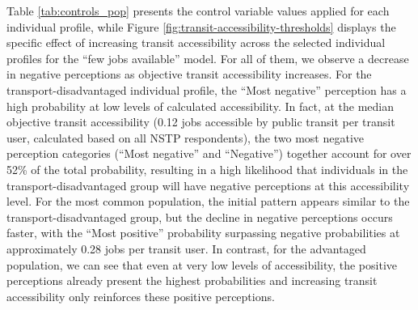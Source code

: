 \documentclass[preprint, 3p,
authoryear]{elsarticle} %
\begin{document}
Table \ref{tab:controls_pop} presents the control variable values
applied for each individual profile, while Figure
\ref{fig:transit-accessibility-thresholds} displays the specific effect
of increasing transit accessibility across the selected individual
profiles for the ``few jobs available'' model. For all of them, we
observe a decrease in negative perceptions as objective transit
accessibility increases. For the transport-disadvantaged individual
profile, the ``Most negative'' perception has a high probability at low
levels of calculated accessibility. In fact, at the median objective
transit accessibility (0.12 jobs accessible by public transit per
transit user, calculated based on all NSTP respondents), the two most
negative perception categories (``Most negative'' and ``Negative'')
together account for over 52\% of the total probability, resulting in a
high likelihood that individuals in the transport-disadvantaged group
will have negative perceptions at this accessibility level. For the most
common population, the initial pattern appears similar to the
transport-disadvantaged group, but the decline in negative perceptions
occurs faster, with the ``Most positive'' probability surpassing
negative probabilities at approximately 0.28 jobs per transit user. In
contrast, for the advantaged population, we can see that even at very
low levels of accessibility, the positive perceptions already present
the highest probabilities and increasing transit accessibility only
reinforces these positive perceptions.
\end{document}
